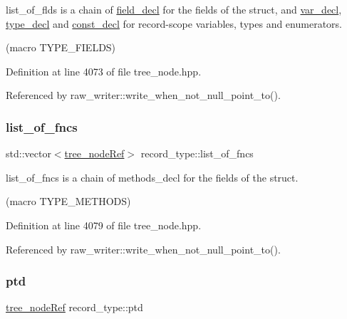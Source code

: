 list\+\_\+of\+\_\+flds is a chain of \hyperlink{structfield__decl}{field\+\_\+decl} for the fields of the struct, and \hyperlink{structvar__decl}{var\+\_\+decl}, \hyperlink{structtype__decl}{type\+\_\+decl} and \hyperlink{structconst__decl}{const\+\_\+decl} for record-\/scope variables, types and enumerators. 

(macro T\+Y\+P\+E\+\_\+\+F\+I\+E\+L\+DS) 

Definition at line 4073 of file tree\+\_\+node.\+hpp.



Referenced by raw\+\_\+writer\+::write\+\_\+when\+\_\+not\+\_\+null\+\_\+point\+\_\+to().

\mbox{\label{structrecord__type_a69ecc29c6ac8b3e1e58e6048cd421359}} 
\subsubsection{\texorpdfstring{list\+\_\+of\+\_\+fncs}{list\_of\_fncs}}
{\footnotesize\ttfamily std\+::vector$<$\hyperlink{tree__node_8hpp_a6ee377554d1c4871ad66a337eaa67fd5}{tree\+\_\+node\+Ref}$>$ record\+\_\+type\+::list\+\_\+of\+\_\+fncs}



list\+\_\+of\+\_\+fncs is a chain of methods\+\_\+decl for the fields of the struct. 

(macro T\+Y\+P\+E\+\_\+\+M\+E\+T\+H\+O\+DS) 

Definition at line 4079 of file tree\+\_\+node.\+hpp.



Referenced by raw\+\_\+writer\+::write\+\_\+when\+\_\+not\+\_\+null\+\_\+point\+\_\+to().

\mbox{\label{structrecord__type_ac0dd4d5e18c078b58506bbc8abbf1bc5}} 
\subsubsection{\texorpdfstring{ptd}{ptd}}
{\footnotesize\ttfamily \hyperlink{tree__node_8hpp_a6ee377554d1c4871ad66a337eaa67fd5}{tree\+\_\+node\+Ref} record\+\_\+type\+::ptd}



